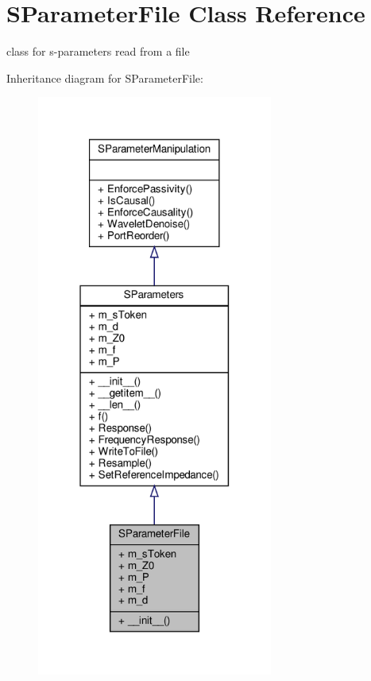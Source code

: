 \hypertarget{classSignalIntegrity_1_1SParameters_1_1SParameterFile_1_1SParameterFile}{}\section{S\+Parameter\+File Class Reference}
\label{classSignalIntegrity_1_1SParameters_1_1SParameterFile_1_1SParameterFile}


class for s-\/parameters read from a file  




Inheritance diagram for S\+Parameter\+File\+:\nopagebreak
\begin{figure}[H]
\begin{center}
\leavevmode
\includegraphics[width=220pt]{classSignalIntegrity_1_1SParameters_1_1SParameterFile_1_1SParameterFile__inherit__graph}
\end{center}
\end{figure}


